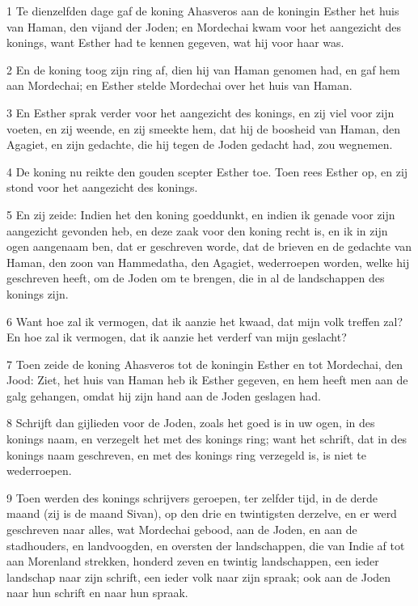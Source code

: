 \par 1 Te dienzelfden dage gaf de koning Ahasveros aan de koningin Esther het huis van Haman, den vijand der Joden; en Mordechai kwam voor het aangezicht des konings, want Esther had te kennen gegeven, wat hij voor haar was.
\par 2 En de koning toog zijn ring af, dien hij van Haman genomen had, en gaf hem aan Mordechai; en Esther stelde Mordechai over het huis van Haman.
\par 3 En Esther sprak verder voor het aangezicht des konings, en zij viel voor zijn voeten, en zij weende, en zij smeekte hem, dat hij de boosheid van Haman, den Agagiet, en zijn gedachte, die hij tegen de Joden gedacht had, zou wegnemen.
\par 4 De koning nu reikte den gouden scepter Esther toe. Toen rees Esther op, en zij stond voor het aangezicht des konings.
\par 5 En zij zeide: Indien het den koning goeddunkt, en indien ik genade voor zijn aangezicht gevonden heb, en deze zaak voor den koning recht is, en ik in zijn ogen aangenaam ben, dat er geschreven worde, dat de brieven en de gedachte van Haman, den zoon van Hammedatha, den Agagiet, wederroepen worden, welke hij geschreven heeft, om de Joden om te brengen, die in al de landschappen des konings zijn.
\par 6 Want hoe zal ik vermogen, dat ik aanzie het kwaad, dat mijn volk treffen zal? En hoe zal ik vermogen, dat ik aanzie het verderf van mijn geslacht?
\par 7 Toen zeide de koning Ahasveros tot de koningin Esther en tot Mordechai, den Jood: Ziet, het huis van Haman heb ik Esther gegeven, en hem heeft men aan de galg gehangen, omdat hij zijn hand aan de Joden geslagen had.
\par 8 Schrijft dan gijlieden voor de Joden, zoals het goed is in uw ogen, in des konings naam, en verzegelt het met des konings ring; want het schrift, dat in des konings naam geschreven, en met des konings ring verzegeld is, is niet te wederroepen.
\par 9 Toen werden des konings schrijvers geroepen, ter zelfder tijd, in de derde maand (zij is de maand Sivan), op den drie en twintigsten derzelve, en er werd geschreven naar alles, wat Mordechai gebood, aan de Joden, en aan de stadhouders, en landvoogden, en oversten der landschappen, die van Indie af tot aan Morenland strekken, honderd zeven en twintig landschappen, een ieder landschap naar zijn schrift, een ieder volk naar zijn spraak; ook aan de Joden naar hun schrift en naar hun spraak.
